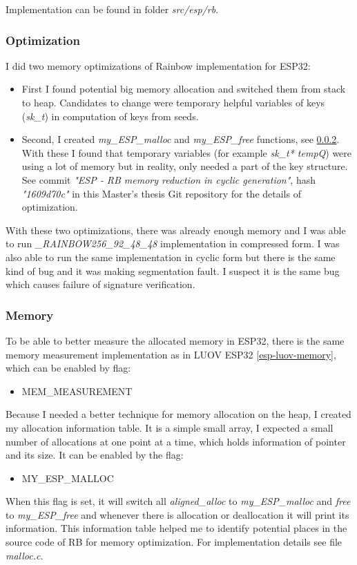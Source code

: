 \documentclass[thesis=M,english]{FITthesis}[2019/12/23]
\begin{document}
\bigskip
\noindent
Implementation can be found in folder \textit{src/esp/rb}.

\subsubsection{Optimization} \label{rb-opti}
I did two memory optimizations of Rainbow implementation for ESP32:
\begin{itemize}
\item	First I found potential big memory allocation and switched them from stack to heap. Candidates to change were temporary helpful variables of keys (\textit{sk\_t}) in computation of keys from seeds.

\item	Second, I created \textit{my\_ESP\_malloc} and \textit{my\_ESP\_free} functions, see \ref{esp-rb-memory}. With these I found that temporary variables (for example \textit{sk\_t* tempQ}) were using a lot of memory but in reality, only needed a part of the key structure. See commit \textit{"ESP - RB memory reduction in cyclic generation"}, hash \textit{"1609d70c"} in this Master's thesis Git repository for the details of optimization.
\end{itemize}

With these two optimizations, there was already enough memory and I was able to run \textit{\_RAINBOW256\_92\_48\_48} implementation in compressed form. I was also able to run the same implementation in cyclic form but there is the same kind of bug and it was making segmentation fault. I suspect it is the same bug
which causes failure of signature verification.

\subsubsection{Memory} \label{esp-rb-memory}
To be able to better measure the allocated memory in ESP32, there is the same memory measurement implementation as in LUOV ESP32 \ref{esp-luov-memory}, which can be enabled by flag:
\begin{itemize}
\item	MEM\_MEASUREMENT
\end{itemize}

Because I needed a better technique for memory allocation on the heap, I created my allocation information table. It is a simple small array, I expected a small number of allocations at one point at a time, which holds information of pointer and its size.
It can be enabled by the flag:
\begin{itemize}
\item	MY\_ESP\_MALLOC
\end{itemize}
When this flag is set, it will switch all \textit{aligned\_alloc} to \textit{my\_ESP\_malloc} and \textit{free} to \textit{my\_ESP\_free} and whenever there is allocation or deallocation it will print its information.
This information table helped me to identify potential places in the source code of RB for memory optimization. For implementation details see file \textit{malloc.c}.
\end{document}
